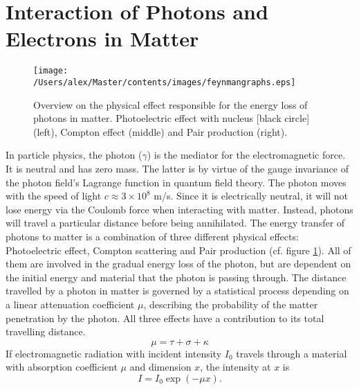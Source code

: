 
\section{Interaction of Photons and Electrons in Matter}
\begin{figure}[hbt]
\centering
\texttt{[image: /Users/alex/Master/contents/images/feynmangraphs.eps]}
\caption{Overview on the physical effect responsible for the energy loss of photons in matter. Photoelectric effect with nucleus [black circle] (left), Compton effect (middle) and Pair production (right).}
\label{fig:feynmangraphs}
\end{figure}
In particle physics, the photon ($\gamma$) is the mediator for the electromagnetic force. It is neutral and has zero mass. The latter is by virtue of the gauge invariance of the photon field's Lagrange function in quantum field theory. The photon moves with the speed of light $c \approx 3\times10^8$ m/s. Since it is electrically neutral, it will not lose energy via the Coulomb force when interacting with matter. Instead, photons will travel a particular distance before being annihilated. The energy transfer of photons to matter is a combination of three different physical effects: Photoelectric effect, Compton scattering and Pair production (cf. figure \ref{fig:feynmangraphs}). All of them are involved in the gradual energy loss of the photon, but are dependent on the initial energy and material that the photon is passing through. The distance travelled by a photon in matter is governed by a statistical process depending on a linear attenuation coefficient $\mu$, describing the probability of the matter penetration by the photon. All three effects have a contribution to its total travelling distance.
\begin{equation}
\mu = \tau + \sigma + \kappa
\end{equation}
If electromagnetic radiation with incident intensity $I_0$ travels through a material with absorption coefficient $\mu$ and dimension $x$, the intensity at $x$ is
\begin{equation}
I = I_0 \exp(-\mu x).
\end{equation}

